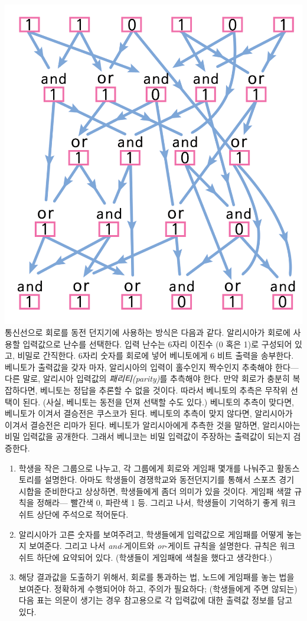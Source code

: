 \documentclass[]{article}
\begin{document}
\includegraphics{csunplugged/05-part/img/ch18-crypto/17-crypto-04-and-or-gates.png}
통신선으로 회로를 동전 던지기에 사용하는 방식은 다음과 같다. 알리시아가
회로에 사용할 입력값으로 난수를 선택한다. 입력 난수는 6자리 이진수 (0
혹은 1)로 구성되어 있고, 비밀로 간직한다. 6자리 숫자를 회로에 넣어
베니토에게 6 비트 출력을 송부한다. 베니토가 출력값을 갖자 마자,
알리시아의 입력이 홀수인지 짝수인지 추축해야 한다--- 다른 말로, 알리시아
입력값의 \emph{패리티(parity)}를 추측해야 한다. 만약 회로가 충분히
복잡하다면, 베니토는 정답을 추론할 수 없을 것이다. 따라서 베니토의
추측은 무작위 선택이 된다. (사실, 베니토는 동전을 던져 선택할 수도
있다.) 베니토의 추측이 맞다면, 베니토가 이겨서 결승전은 쿠스코가 된다.
베니토의 추측이 맞지 않다면, 알리시아가 이겨서 결승전은 리마가 된다.
베니토가 알리시아에게 추측한 것을 말하면, 알리시아는 비밀 입력값을
공개한다. 그래서 베니코는 비밀 입력값이 주장하는 출력값이 되는지
검증한다.

\begin{enumerate}
\item
  학생을 작은 그룹으로 나누고, 각 그룹에게 회로와 게임패 몇개를 나눠주고
  활동스토리를 설명한다. 아마도 학생들이 경쟁학교와 동전던지기를 통해서
  스포츠 경기 시합을 준비한다고 상상하면, 학생들에게 좀더 의미가 있을
  것이다. 게임패 색깔 규칙을 정해라--- 빨간색 0, 파란색 1 등. 그리고
  나서, 학생들이 기억하기 좋게 워크쉬트 상단에 주석으로 적어둔다.
\item
  알리시아가 고른 숫자를 보여주려고, 학생들에게 입력값으로 게임패를
  어떻게 놓는지 보여준다. 그리고 나서 \emph{and}-게이트와
  \emph{or}-게이트 규칙을 설명한다. 규칙은 워크쉬트 하단에 요약되어
  있다. (학생들이 게임패에 색칠을 했다고 생각한다.)
\item
  해당 결과값을 도출하기 위해서, 회로를 통과하는 법, 노드에 게임패를
  놓는 법을 보여준다. 정확하게 수행되어야 하고, 주의가 필요하다;
  (학생들에게 주면 않되는) 다음 표는 의문이 생기는 경우 참고용으로 각
  입력값에 대한 출력값 정보를 담고 있다.
\end{enumerate}
\end{document}

